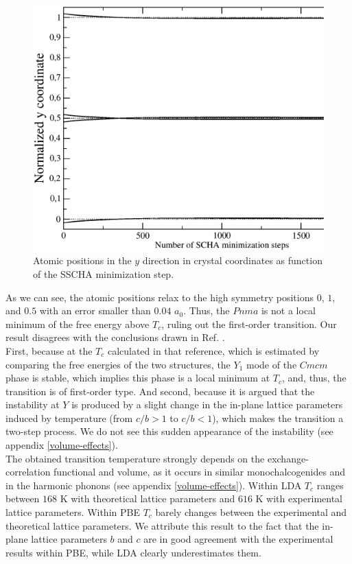\begin{figure}[h]
\begin{center}
\includegraphics[width=0.9\linewidth]{Figures/positions.eps}
\caption{Atomic positions in the $y$ direction in crystal coordinates as function of the SSCHA minimization step.}
\label{atomic-relaxation}
\end{center}
\end{figure}
As we can see, the atomic positions relax to the high symmetry positions $0$, $1$, and $0.5$ with an error smaller than $0.04$ $a_{0}$. Thus, the $Pnma$ is not a local minimum of the free energy above $T_{c}$, ruling out the 
first-order transition. Our result disagrees with the conclusions drawn in Ref. \cite{dewandre2016two}. \\

First, because at the $T_{c}$ calculated in that reference, which is estimated by comparing the free energies of the 
two structures, the $Y_{1}$ mode of the $Cmcm$ phase is stable, which implies this phase is a local minimum 
at $T_{c}$, and, thus, the transition is of first-order type. And second, because it is argued that the instability 
at $Y$ is produced by a slight change in the in-plane lattice parameters induced by temperature (from $c/b>1$ to 
$c/b<1$), which makes the transition a two-step process. We do not see this sudden appearance of the instability 
(see appendix \ref{volume-effects}). \\

The obtained transition temperature strongly depends on the exchange-correlation functional and volume, as it occurs in similar monochalcogenides\cite{ribeiro2018strong} and in the harmonic phonons (see appendix \ref{volume-effects}). 
Within LDA $T_{c}$ ranges between $168$ K with 
theoretical lattice parameters and $616$ K with experimental lattice parameters. Within PBE $T_{c}$ barely changes between the experimental and theoretical lattice parameters. We attribute this result to the fact that 
the in-plane lattice parameters $b$ and $c$ are in good agreement with the experimental results within PBE, while LDA clearly underestimates them. \\


